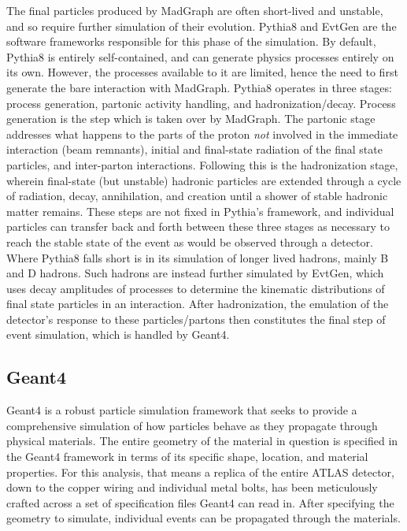     The final particles produced by MadGraph are often short-lived and unstable,
        and so require further simulation of their evolution.
    Pythia8 and EvtGen are the software frameworks responsible for this phase of the simulation. 
    By default, Pythia8 is entirely self-contained, and can generate physics processes entirely on its own.
    However, the processes available to it are limited,
        hence the need to first generate the bare interaction with MadGraph.
    Pythia8 operates in three stages: process generation, partonic activity handling, and hadronization/decay.
    Process generation is the step which is taken over by MadGraph.
    The partonic stage addresses what happens to the parts of the proton \textit{not} involved in the immediate interaction (beam remnants),
        initial and final-state radiation of the final state particles, and inter-parton interactions.
    Following this is the hadronization stage, wherein final-state (but unstable)
        hadronic particles are extended through a cycle of radiation, decay, annihilation, and creation
        until a shower of stable hadronic matter remains.
    These steps are not fixed in Pythia's framework,
        and individual particles can transfer back and forth between these three stages
        as necessary to reach the stable state of the event as would be observed through a detector.
    Where Pythia8 falls short is in its simulation of longer lived hadrons,
        mainly B and D hadrons.
    Such hadrons are instead further simulated by EvtGen,
        which uses decay amplitudes of processes to determine the kinematic distributions
        of final state particles in an interaction.
    After hadronization, the emulation of the detector's response to these particles/partons
        then constitutes the final step of event simulation, which is handled by Geant4.
    

    \subsection{Geant4}

    Geant4 is a robust particle simulation framework
        that seeks to provide a comprehensive simulation of how particles behave as they propagate through physical materials.
    The entire geometry of the material in question is specified in the Geant4 framework in terms of
        its specific shape, location, and material properties.
    For this analysis, that means a replica of the entire ATLAS detector,
        down to the copper wiring and individual metal bolts,
        has been meticulously crafted across a set of specification files Geant4 can read in.
    After specifying the geometry to simulate, individual events can be propagated through the materials.

